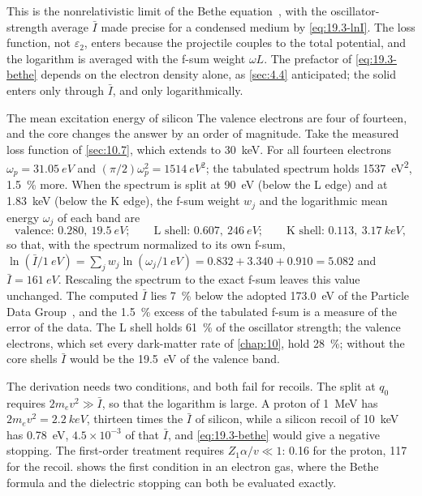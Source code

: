\noindent This is the nonrelativistic limit of the Bethe equation~\cite[Eq.~(34.5)]{navas2024review}, with the oscillator-strength average $\bar I$ made precise for a condensed medium by \cref{eq:19.3-lnI}. The loss function, not $\varepsilon_2$, enters because the projectile couples to the total potential, and the logarithm is averaged with the f-sum weight $\omega L$. The prefactor of \cref{eq:19.3-bethe} depends on the electron density alone, as \cref{sec:4.4} anticipated; the solid enters only through $\bar I$, and only logarithmically.

\begin{workedexample}{The mean excitation energy of silicon}\label{we:19-lnI}
The valence electrons are four of fourteen, and the core changes the answer by an order of magnitude. Take the measured loss function of \cref{sec:10.7}, which extends to \SI{30}{keV}. For all fourteen electrons $\omega_p = \SI{31.05}{eV}$ and $(\pi/2)\omega_p^2 = \SI{1514}{eV^2}$; the tabulated spectrum holds \SI{1537}{eV^2}, \SI{1.5}{\percent} more. When the spectrum is split at \SI{90}{eV} (below the L edge) and at \SI{1.83}{keV} (below the K edge), the f-sum weight $w_j$ and the logarithmic mean energy $\omega_j$ of each band are
\begin{equation*}
  \text{valence: } 0.280,\ \SI{19.5}{eV} ; \qquad \text{L shell: } 0.607,\ \SI{246}{eV} ; \qquad \text{K shell: } 0.113,\ \SI{3.17}{keV} ,
\end{equation*}
so that, with the spectrum normalized to its own f-sum, $\ln(\bar I/\SI{1}{eV}) = \sum_jw_j\ln(\omega_j/\SI{1}{eV}) = 0.832 + 3.340 + 0.910 = 5.082$ and $\bar I = \SI{161}{eV}$. Rescaling the spectrum to the exact f-sum leaves this value unchanged. The computed $\bar I$ lies \SI{7}{\percent} below the adopted \SI{173.0}{eV} of the Particle Data Group~\cite{pdg2024atomic}, and the \SI{1.5}{\percent} excess of the tabulated f-sum is a measure of the error of the data. The L shell holds \SI{61}{\percent} of the oscillator strength; the valence electrons, which set every dark-matter rate of \cref{chap:10}, hold \SI{28}{\percent}; without the core shells $\bar I$ would be the \SI{19.5}{eV} of the valence band.
\end{workedexample}

The derivation needs two conditions, and both fail for recoils. The split at $q_0$ requires $2m_ev^2 \gg \bar I$, so that the logarithm is large. A proton of \SI{1}{MeV} has $2m_ev^2 = \SI{2.2}{keV}$, thirteen times the $\bar I$ of silicon, while a silicon recoil of \SI{10}{keV} has \SI{0.78}{eV}, $4.5\times10^{-3}$ of that $\bar I$, and \cref{eq:19.3-bethe} would give a negative stopping. The first-order treatment requires $Z_1\alpha/v \ll 1$: 0.16 for the proton, 117 for the recoil.  shows the first condition in an electron gas, where the Bethe formula and the dielectric stopping can both be evaluated exactly.

